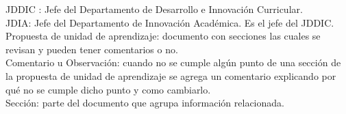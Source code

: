 ﻿%
JDDIC : Jefe del Departamento de Desarrollo e Innovación Curricular.\\
JDIA: Jefe del Departamento de Innovación Académica. Es el jefe del JDDIC.\\
Propuesta de unidad de aprendizaje: documento con secciones las cuales se revisan y pueden tener comentarios o no.\\
Comentario u Observación: cuando no se cumple algún punto de una sección de la propuesta de unidad de aprendizaje se agrega un comentario explicando por qué no se cumple dicho punto y como cambiarlo.\\
Sección: parte del documento que agrupa información relacionada.\\

